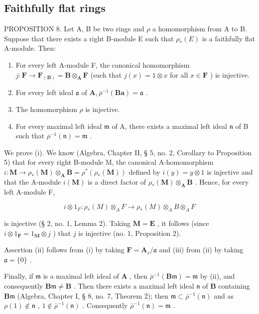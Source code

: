 \subsection{Faithfully flat rings}

PROPOSITION 8. Let A, B be two rings and \(\rho\) a homomorphism from A to B. Suppose that there exists a right B-module E such that \(\rho_{*}(E)\) is a faithfully flat A-module. Then:

\begin{enumerate}
\def\labelenumi{(\roman{enumi})}
\item
  For every left A-module F, the canonical homomorphism \(j: \mathbf{F} \to \mathbf{F}_{(\mathbf{B})} = \mathbf{B} \otimes_{\mathbf{A}} \mathbf{F}\) (such that \(j(x) = 1 \otimes x\) for all \(x \in \mathbf{F}\) ) is injective.
\item
  For every left ideal \(\mathfrak{a}\) of \(\mathbf{A},\overline{\rho}^{-1}(\mathbf{Ba}) = \mathfrak{a}\) .
\item
  The homomorphism \(\rho\) is injective.
\item
  For every maximal left ideal \(\mathfrak{m}\) of A, there exists a maximal left ideal \(\mathfrak{n}\) of B such that \(\overline{\rho}^{-1}(\mathfrak{n}) = \mathfrak{m}\) .
\end{enumerate}

We prove (i). We know (Algebra, Chapter II, § 5, no. 2, Corollary to Proposition 5) that for every right B-module M, the canonical A-homomorphism \(i: \mathbf{M} \to \rho_*(\mathbf{M}) \otimes_{\mathbf{A}} \mathbf{B} = \rho^*(\rho_*(\mathbf{M}))\) defined by \(i(y) = y \otimes 1\) is injective and that the A-module \(i(\mathbf{M})\) is a direct factor of \(\rho_*(\mathbf{M}) \otimes_{\mathbf{A}} \mathbf{B}\) . Hence, for every left A-module F,

\[
i \otimes 1 _ {F}: \rho_ {*} (M) \otimes_ {A} F \rightarrow \rho_ {*} (M) \otimes_ {A} B \otimes_ {A} F
\]

is injective (§ 2, no. 1, Lemma 2). Taking \(\mathbf{M} = \mathbf{E}\) , it follows (since \(i \otimes 1_{\mathbf{F}} = 1_{\mathbf{M}} \otimes j\) ) that \(j\) is injective (no. 1, Proposition 2).

Assertion (ii) follows from (i) by taking \(\mathbf{F} = \mathbf{A}_s / \mathfrak{a}\) and (iii) from (ii) by taking \(\mathfrak{a} = \{0\}\) .

Finally, if \(\mathfrak{m}\) is a maximal left ideal of \(\mathbf{A}\) , then \(\bar{\rho}^{-1}(\mathbf{B}\mathfrak{m}) = \mathfrak{m}\) by (ii), and consequently \(\mathbf{B}\mathfrak{m} \neq \mathbf{B}\) . Then there exists a maximal left ideal \(\mathfrak{n}\) of \(\mathbf{B}\) containing \(\mathbf{B}\mathfrak{m}\) (Algebra, Chapter I, § 8, no. 7, Theorem 2); then \(\mathfrak{m} \subset \bar{\rho}^{-1}(\mathfrak{n})\) and as \(\rho(1) \notin \mathfrak{n}\) , \(1 \notin \bar{\rho}^{-1}(\mathfrak{n})\) . Consequently \(\bar{\rho}^{-1}(\mathfrak{n}) = \mathfrak{m}\) .

